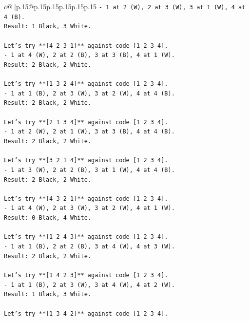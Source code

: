 \documentclass{article}
\begin{document}
{\begin{supertabular}{c@{$\;$}|p{.15\linewidth}@{}p{.15\linewidth}p{.15\linewidth}p{.15\linewidth}p{.15\linewidth}p{.15\linewidth}}
{{{\texttt{{-} 1 at 2 (W), 2 at 3 (W), 3 at 1 (W), 4 at 4 (B).} \\
\texttt{Result: 1 Black, 3 White.} \\
\\ 
\texttt{Let's try **{[}4 2 3 1{]}** against code {[}1 2 3 4{]}.} \\
\texttt{{-} 1 at 4 (W), 2 at 2 (B), 3 at 3 (B), 4 at 1 (W).} \\
\texttt{Result: 2 Black, 2 White.} \\
\\ 
\texttt{Let's try **{[}1 3 2 4{]}** against code {[}1 2 3 4{]}.} \\
\texttt{{-} 1 at 1 (B), 2 at 3 (W), 3 at 2 (W), 4 at 4 (B).} \\
\texttt{Result: 2 Black, 2 White.} \\
\\ 
\texttt{Let's try **{[}2 1 3 4{]}** against code {[}1 2 3 4{]}.} \\
\texttt{{-} 1 at 2 (W), 2 at 1 (W), 3 at 3 (B), 4 at 4 (B).} \\
\texttt{Result: 2 Black, 2 White.} \\
\\ 
\texttt{Let's try **{[}3 2 1 4{]}** against code {[}1 2 3 4{]}.} \\
\texttt{{-} 1 at 3 (W), 2 at 2 (B), 3 at 1 (W), 4 at 4 (B).} \\
\texttt{Result: 2 Black, 2 White.} \\
\\ 
\texttt{Let's try **{[}4 3 2 1{]}** against code {[}1 2 3 4{]}.} \\
\texttt{{-} 1 at 4 (W), 2 at 3 (W), 3 at 2 (W), 4 at 1 (W).} \\
\texttt{Result: 0 Black, 4 White.} \\
\\ 
\texttt{Let's try **{[}1 2 4 3{]}** against code {[}1 2 3 4{]}.} \\
\texttt{{-} 1 at 1 (B), 2 at 2 (B), 3 at 4 (W), 4 at 3 (W).} \\
\texttt{Result: 2 Black, 2 White.} \\
\\ 
\texttt{Let's try **{[}1 4 2 3{]}** against code {[}1 2 3 4{]}.} \\
\texttt{{-} 1 at 1 (B), 2 at 3 (W), 3 at 4 (W), 4 at 2 (W).} \\
\texttt{Result: 1 Black, 3 White.} \\
\\ 
\texttt{Let's try **{[}1 3 4 2{]}** against code {[}1 2 3 4{]}.} \\
}}}
\end{supertabular}}
\end{document}
